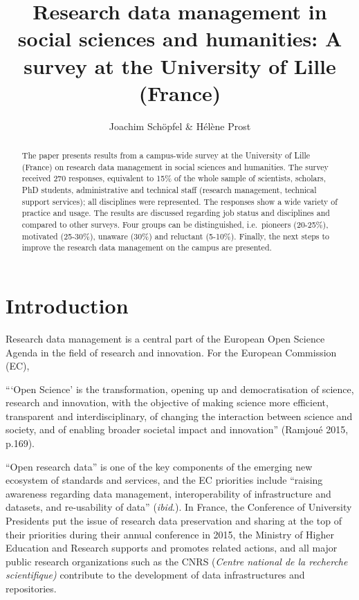 \documentclass[a4paper,
fontsize=11pt,
oneside,
numbers=noperiodatend,
parskip=half-,
bibliography=totoc,
final
]{scrartcl}
\title{\LARGE{Research data management in social sciences and humanities: A survey at the University of Lille (France)
}} %
\author{Joachim Schöpfel \& Hélène Prost} %
\date{}
\begin{document}
\maketitle
\thispagestyle{fancyplain} 

\begin{abstract}
The paper presents results from a campus-wide survey at the University
of Lille (France) on research data management in social sciences and
humanities. The survey received 270 responses, equivalent to 15\% of the
whole sample of scientists, scholars, PhD students, administrative and
technical staff (research management, technical support services); all
disciplines were represented. The responses show a wide variety of
practice and usage. The results are discussed regarding job status and
disciplines and compared to other surveys. Four groups can be
distinguished, i.e.~pioneers (20-25\%), motivated (25-30\%), unaware
(30\%) and reluctant (5-10\%). Finally, the next steps to improve the
research data management on the campus are presented.


\end{abstract}

\section*{Introduction}\label{introduction}

Research data management is a central part of the European Open Science
Agenda in the field of research and innovation. For the European
Commission (EC),

\enquote{\enquote{Open Science} is the transformation, opening up and
democratisation of science, research and innovation, with the objective
of making science more efficient, transparent and interdisciplinary, of
changing the interaction between science and society, and of enabling
broader societal impact and innovation} (Ramjoué 2015, p.169).

\enquote{Open research data} is one of the key components of the
emerging new ecosystem of standards and services, and the EC priorities
include \enquote{raising awareness regarding data management,
interoperability of infrastructure and datasets, and re-usability of
data} (\emph{ibid}.). In France, the Conference of University Presidents
put the issue of research data preservation and sharing at the top of
their priorities during their annual conference in 2015, the Ministry of
Higher Education and Research supports and promotes related actions, and
all major public research organizations such as the CNRS (\emph{Centre
national de la recherche scientifique)} contribute to the development of
data infrastructures and repositories.
\end{document}
